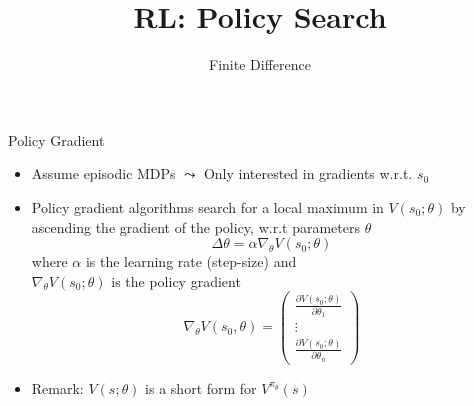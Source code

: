 \documentclass[aspectratio=169]{../latex_main/tntbeamer}  %
\title[RL: Finite Difference]{RL: Policy Search}
\subtitle{Finite Difference}
\begin{document}
	
	\maketitle

\begin{frame}[c]{Policy Gradient}

\begin{itemize}
	\item Assume episodic MDPs $\leadsto$ Only interested in gradients w.r.t. $s_0$
	\item Policy gradient algorithms search for a \alert{local} maximum in $V(s_0;\theta)$ by ascending the gradient of the policy, w.r.t parameters $\theta$
	$$\Delta \theta = \alpha \nabla_\theta V(s_0; \theta) $$
	where $\alpha$ is the learning rate (step-size) and\\ $\nabla_\theta V(s_0; \theta)$ is the policy gradient
		$$\nabla_\theta V(s_0, \theta) = \begin{pmatrix}
	\frac{\partial V(s_0; \theta)}{\partial \theta_1}\\
	\vdots\\
	\frac{\partial V(s_0; \theta)}{\partial \theta_n}
	\end{pmatrix} $$
	\medskip
	\item Remark: $V(s;\theta)$ is a short form for $V^{\pi_{\theta}}(s)$ 
\end{itemize}

\end{frame}
\end{document}

